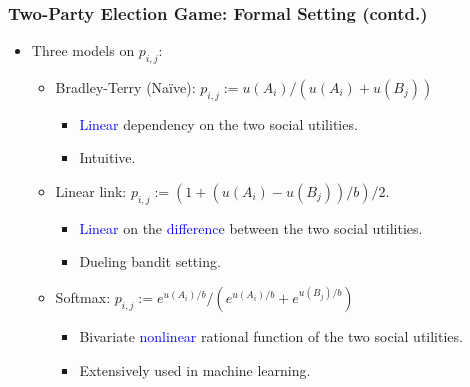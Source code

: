 \documentclass[xcolor=dvipsnames,envcountsect]{beamer}
\begin{document}
\begin{frame}
	\frametitle{Two-Party Election Game: Formal Setting (contd.)}
	\begin{itemize}
		\item Three models on $p_{i,j}$: 
		\vspace{5pt}
		\begin{itemize}
			\item \alert{Bradley-Terry (Na\"{i}ve)}: $p_{i,j} := u(A_i)/(u(A_i) + u(B_j))$
			\begin{itemize}
				\item \textcolor{blue}{Linear} dependency on the two social utilities.
				\item Intuitive. 
			\end{itemize}
			\vspace{3pt}
			\item \alert{Linear link}: $p_{i,j} := (1 + (u(A_i) - u(B_j))/b)/2$.
			\begin{itemize}
				\item \textcolor{blue}{Linear} on the  \textcolor{blue}{difference} between the two social utilities.
				\item Dueling bandit setting.
			\end{itemize}
			\vspace{3pt}
			\item \alert{Softmax}: $p_{i,j} := e^{u(A_i)/b}/(e^{u(A_i)/b} + e^{u(B_j)/b})$
			\begin{itemize}
				\item Bivariate \textcolor{blue}{nonlinear} rational function of the two social utilities. 
				\item Extensively used in machine learning. 
			\end{itemize}
		\end{itemize}
	\end{itemize}
\end{frame}
\end{document}
